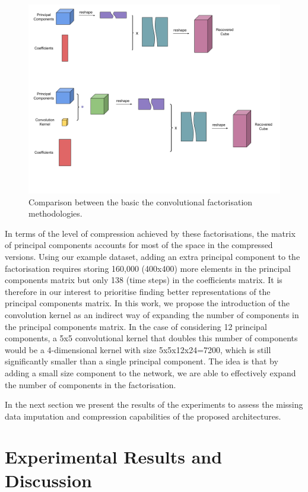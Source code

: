 \documentclass[essd, manuscript]{copernicus}
\begin{document}
\begin{figure}%
    \includegraphics[width=14cm]{fig6.png}
    \caption{Comparison between the basic the convolutional factorisation methodologies.}%
    \label{factorisation_methods}%
\end{figure}

In terms of the level of compression achieved by these factorisations, the matrix of principal components accounts for most of the space in the compressed versions. Using our example dataset, adding an extra principal component to the factorisation requires storing 160,000 (400x400) more elements in the principal components matrix but only 138 (time steps) in the coefficients matrix. It is therefore in our interest to prioritise finding better representations of the principal components matrix. In this work, we propose the introduction of the convolution kernel as an indirect way of expanding the number of components in the principal components matrix. In the case of considering 12 principal components, a 5x5 convolutional kernel that doubles this number of components would be a 4-dimensional kernel with size 5x5x12x24=7200, which is still significantly smaller than a single principal component. The idea is that by adding a small size component to the network, we are able to effectively expand the number of components in the factorisation.

In the next section we present the results of the experiments to assess the missing data imputation and compression capabilities of the proposed architectures. 


\section{Experimental Results and Discussion}
\end{document}

